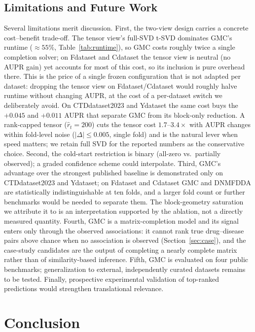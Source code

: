 \documentclass[webpdf,modern,large]{oup-authoring-template}
\begin{document}
\subsection{Limitations and Future Work}

Several limitations merit discussion. First, the two-view design carries a concrete cost--benefit trade-off. The tensor view's full-SVD t-SVD dominates GMC's runtime ($\approx\!55\%$, Table~\ref{tab:runtime}), so GMC costs roughly twice a single completion solver; on Fdataset and Cdataset the tensor view is neutral (no AUPR gain) yet accounts for most of this cost, so its inclusion is pure overhead there. This is the price of a single frozen configuration that is not adapted per dataset: dropping the tensor view on Fdataset/Cdataset would roughly halve runtime without changing AUPR, at the cost of a per-dataset switch we deliberately avoid. On CTDdataset2023 and Ydataset the same cost buys the $+0.045$ and $+0.011$ AUPR that separate GMC from its block-only reduction. A rank-capped tensor ($\hat r_t=200$) cuts the tensor cost $1.7$--$3.4\times$ with AUPR changes within fold-level noise ($|\Delta|\le 0.005$, single fold) and is the natural lever when speed matters; we retain full SVD for the reported numbers as the conservative choice. Second, the cold-start restriction is binary (all-zero vs.\ partially observed); a graded confidence scheme could interpolate. Third, GMC's advantage over the strongest published baseline is demonstrated only on CTDdataset2023 and Ydataset; on Fdataset and Cdataset GMC and DNMFDDA are statistically indistinguishable at ten folds, and a larger fold count or further benchmarks would be needed to separate them. The block-geometry saturation we attribute it to is an interpretation supported by the ablation, not a directly measured quantity. Fourth, GMC is a matrix-completion model and its signal enters only through the observed associations: it cannot rank true drug--disease pairs above chance when no association is observed (Section~\ref{sec:case}), and the case-study candidates are the output of completing a nearly complete matrix rather than of similarity-based inference. Fifth, GMC is evaluated on four public benchmarks; generalization to external, independently curated datasets remains to be tested. Finally, prospective experimental validation of top-ranked predictions would strengthen translational relevance.

\section{Conclusion}
\end{document}

